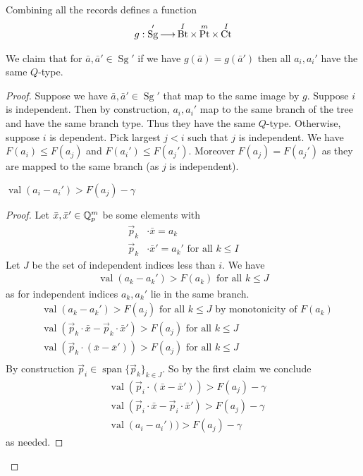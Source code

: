 \documentclass{amsart}
\DeclareMathOperator{\Sg}{Sg}
\DeclareMathOperator{\Bt}{Bt}
\DeclareMathOperator{\Pt}{Pt}
\DeclareMathOperator{\Ct}{Ct}
\DeclareMathOperator{\vecspan}{span}
\DeclareMathOperator{\val}{val}
\begin{document}
Combining all the records defines a function
\begin{align*}
	g: \Sg' \arr \Bt^I \times \Pt^m \times \Ct^I
\end{align*}

We claim that for $\bar a, \bar a' \in \Sg'$ if we have $g(\bar a) = g(\bar a')$ then all $a_i, a_i'$ have the same $Q$-type.

\begin{proof}
	Suppose we have $\bar a, \bar a' \in \Sg'$ that map to the same image by $g$.
	Suppose $i$ is independent.
	Then by construction, $a_i, a_i'$ map to the same branch of the tree and have the same branch type.
	Thus they have the same $Q$-type.
	Otherwise, suppose $i$ is dependent.
	Pick largest $j < i$ such that $j$ is independent.
	We have $F(a_i) \leq F(a_j)$ and $F(a_i') \leq F(a_j')$.
	Moreover $F(a_j) = F(a_j')$ as they are mapped to the same branch (as $j$ is independent).
	
	\begin{Claim}
		$\val(a_i - a_i') > F(a_j) - \gamma$
	\end{Claim}
	\begin{proof}
		Let $\bar x, \bar x' \in \mathbb{Q}_p^m$ be some elements with
		\begin{align*}
			\vec p_k &\cdot \bar x = a_k \\
			\vec p_k &\cdot \bar x' = a_k' \text { for all } k \leq I
		\end{align*}
		Let $J$ be the set of independent indices less than $i$.
		We have 
		\begin{align*}
			\val(a_k - a_k') > F(a_k) \text { for all } k \leq J
		\end{align*}
		as for independent indices $a_k, a_k'$ lie in the same branch.
		\begin{align*}
			&\val(a_k - a_k') > F(a_j) \text { for all } k \leq J \text{ by monotonicity of $F(a_k)$} \\
			&\val(\vec p_k \cdot \bar x - \vec p_k \cdot \bar x') > F(a_j) \text { for all } k \leq J \\
			&\val(\vec p_k \cdot (\bar x - \bar x')) > F(a_j) \text { for all } k \leq J \\
		\end{align*}
		By construction $\vec p_i \in \vecspan\{\vec p_k\}_{k \in J}$. So by the first claim we conclude
		\begin{align*}
			&\val(\vec p_i \cdot (\bar x - \bar x')) > F(a_j) - \gamma \\
			&\val(\vec p_i \cdot \bar x - \vec p_i \cdot \bar x') > F(a_j) - \gamma \\
			&\val(a_i - a_i')) > F(a_j) - \gamma
		\end{align*}
		as needed.
	\end{proof}
	

\end{proof}
\end{document}
